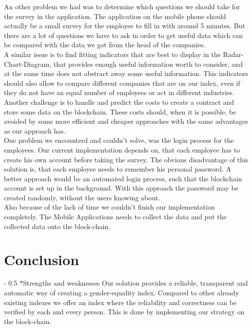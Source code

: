 \documentclass[portrait,a4paper]{article}
\makeatletter
\renewcommand\paragraph{\@startsection{paragraph}{4}{0mm}%
	{-\baselineskip}%
	{0.5\baselineskip}%
	{\normalfont\bfseries}%
}%
\makeatother
\begin{document}
		An other problem we had was to determine which questions we should take for the survey in the application. 
		The application on the mobile phone should actually be a small survey for the employee to fill in with around 
		5 minutes. But there are a lot of questions we have to ask in order to get useful data which can be 
		compared with the data we got from the head of the companies.\\
		
		A similar issue is to find fitting indicators that are best to display in the Radar-Chart-Diagram, that provides
		enough useful information worth to consider, and at the same time does not abstract away some useful information.
		This indicators should also allow to compare different companies that are on our index, even if they do not have
		an equal number of employees or act in different industries.\\
		
		Another challenge is to handle and predict the costs to create a contract and store some data on the blockchain.
		These costs should, when it is possible, be avoided by some more efficient and cheaper approaches with
		the same advantages as our approach has.\\
		
		One problem we encounterd and couldn't solve, was the login process for the employees. 
		Our current implementation depends on, that each employee has to create his own account before taking the survey.
		The obvious disadvantage of this solution is, that each employee needs to remember his personal password. 
		A better approach would be an automated login process, such that the blockchain account is set up in the
		background. With this approach the password may be created randomly, without the users knowing about.\\

		Also because of the lack of time we couldn't finish our implementation completely. 
		The Mobile Applications needs to collect the data and put the collected data onto the block-chain.


\section{Conclusion}
	\paragraph*{Strengths and weaknesses}
		Our solution provides a reliable, transparent and automatic way of creating a gender-equality index. 
		Compared to other already existing indexes we offer an index where the reliability and correctness 
		can be verified by each and every person. This is done by implementing our strategy on the block-chain.
		
\end{document}

